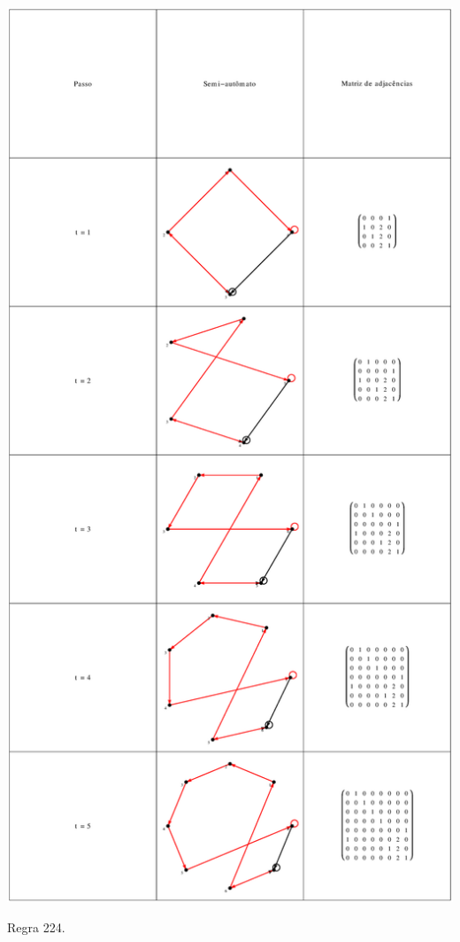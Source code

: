 \documentclass[12pt,a4paper]{article}
\begin{document}
\begin{table}[H]
\begin{center}
\includegraphics[scale=0.32]{img/mat/matr224.eps}
\caption{Regra 224.}
\label{tab:mr224}
\end{center}
\end{table}
\end{document}
